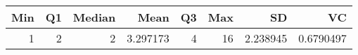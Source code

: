 
\begin{tabular}[t]{rrrrrrrr}
\toprule
Min & Q1 & Median & Mean & Q3 & Max & SD & VC\\
\midrule
1 & 2 & 2 & 3.297173 & 4 & 16 & 2.238945 & 0.6790497\\
\bottomrule
\end{tabular}